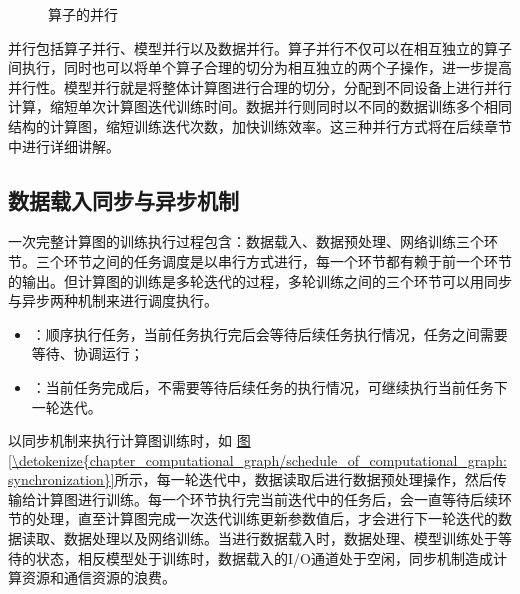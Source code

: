 \documentclass[letterpaper,10pt,english]{sphinxmanual}
\let\sphinxpxdimen\pdfpxdimen\else\newdimen\sphinxpxdimen
\begin{document}
\begin{figure}[H]
\centering
\capstart

\noindent\sphinxincludegraphics[width=800\sphinxpxdimen]{{para}.svg}
\caption{算子的并行}\label{\detokenize{chapter_computational_graph/schedule_of_computational_graph:id7}}\label{\detokenize{chapter_computational_graph/schedule_of_computational_graph:para}}\end{figure}

\sphinxAtStartPar
并行包括算子并行、模型并行以及数据并行。算子并行不仅可以在相互独立的算子间执行，同时也可以将单个算子合理的切分为相互独立的两个子操作，进一步提高并行性。模型并行就是将整体计算图进行合理的切分，分配到不同设备上进行并行计算，缩短单次计算图迭代训练时间。数据并行则同时以不同的数据训练多个相同结构的计算图，缩短训练迭代次数，加快训练效率。这三种并行方式将在后续章节中进行详细讲解。


\subsection{数据载入同步与异步机制}
\label{\detokenize{chapter_computational_graph/schedule_of_computational_graph:id4}}
\sphinxAtStartPar
一次完整计算图的训练执行过程包含：数据载入、数据预处理、网络训练三个环节。三个环节之间的任务调度是以串行方式进行，每一个环节都有赖于前一个环节的输出。但计算图的训练是多轮迭代的过程，多轮训练之间的三个环节可以用同步与异步两种机制来进行调度执行。
\begin{itemize}
\item {} 
\sphinxAtStartPar
{}：顺序执行任务，当前任务执行完后会等待后续任务执行情况，任务之间需要等待、协调运行；

\item {} 
\sphinxAtStartPar
{}：当前任务完成后，不需要等待后续任务的执行情况，可继续执行当前任务下一轮迭代。

\end{itemize}

\sphinxAtStartPar
以同步机制来执行计算图训练时，如
\hyperref[\detokenize{chapter_computational_graph/schedule_of_computational_graph:synchronization}]{图\ref{\detokenize{chapter_computational_graph/schedule_of_computational_graph:synchronization}}}所示，每一轮迭代中，数据读取后进行数据预处理操作，然后传输给计算图进行训练。每一个环节执行完当前迭代中的任务后，会一直等待后续环节的处理，直至计算图完成一次迭代训练更新参数值后，才会进行下一轮迭代的数据读取、数据处理以及网络训练。当进行数据载入时，数据处理、模型训练处于等待的状态，相反模型处于训练时，数据载入的I/O通道处于空闲，同步机制造成计算资源和通信资源的浪费。
\end{document}
